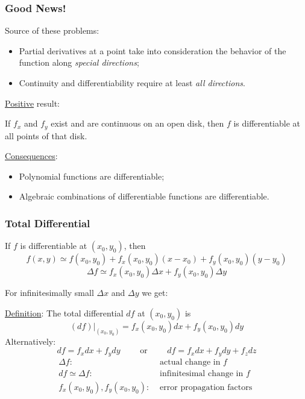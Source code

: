 \begin{frame}
  \frametitle{Good News!}

  Source of these problems:
\begin{itemize}
  \item Partial derivatives at a point take into consideration the behavior of the function along \emph{special directions};
  \item Continuity and differentiability require at least \emph{all directions}.
\end{itemize}

\pause \underline{Positive} result:

\begin{theorem}
   If $f_x$ and $f_y$ exist and are continuous on an open disk, then $f$ is differentiable at all points of that disk.
\end{theorem}

\pause \underline{Consequences}:
\begin{itemize}
  \item Polynomial functions are differentiable;
  \item Algebraic combinations of differentiable functions are differentiable.
\end{itemize}
\end{frame}


\begin{frame}
  \frametitle{Total Differential}

If $f$ is differentiable at $(x_0,y_0)$, then
%
$$f(x,y) \simeq f(x_0,y_0)+ f_x(x_0,y_0)(x-x_0) + f_y(x_0,y_0) (y-y_0)$$
%
$$\Delta f \simeq f_x(x_0,y_0) \Delta x + f_y(x_0,y_0) \Delta y$$

\pause For infinitesimally small $\Delta x$ and $\Delta y$ we get:

\underline{Definition}: The \textcolor[rgb]{0.98,0.00,0.00}{total differential} $df$ at $(x_0,y_0)$ is
%
$$\left. (df) \right|_{(x_0,y_0)} = f_x(x_0,y_0) dx + f_y(x_0,y_0) dy$$
%
\pause Alternatively:
%
$$df = f_x dx + f_y dy \qquad \text{ or } \qquad  df = f_x dx + f_y dy + f_z dz$$
%
\begin{align*}
  \Delta f: & \text{ actual change in } f\\
  df \simeq \Delta f: & \text{ infinitesimal change in } f\\
  f_x(x_0,y_0), f_y(x_0,y_0): & \text{ error propagation factors }
\end{align*}

\end{frame}

